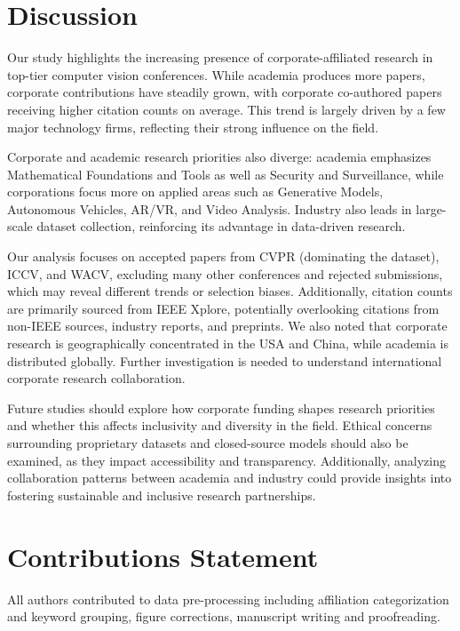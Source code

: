 \documentclass{article}
\begin{document}
\section{Discussion}
\vspace{-7pt}
Our study highlights the increasing presence of corporate-affiliated research in top-tier computer vision conferences. While academia produces more papers, corporate contributions have steadily grown, with corporate co-authored papers receiving higher citation counts on average. This trend is largely driven by a few major technology firms, reflecting their strong influence on the field.

Corporate and academic research priorities also diverge: academia emphasizes Mathematical Foundations and Tools as well as Security and Surveillance, while corporations focus more on applied areas such as Generative Models, Autonomous Vehicles, AR/VR, and Video Analysis. Industry also leads in large-scale dataset collection, reinforcing its advantage in data-driven research.

Our analysis focuses on accepted papers from CVPR (dominating the dataset), ICCV, and WACV, excluding many other conferences and rejected submissions, which may reveal different trends or selection biases. Additionally, citation counts are primarily sourced from IEEE Xplore, potentially overlooking citations from non-IEEE sources, industry reports, and preprints. We also noted that corporate research is geographically concentrated in the USA and China, while academia is distributed globally. Further investigation is needed to understand international corporate research collaboration.

Future studies should explore how corporate funding shapes research priorities and whether this affects inclusivity and diversity in the field. Ethical concerns surrounding proprietary datasets and closed-source models should also be examined, as they impact accessibility and transparency. Additionally, analyzing collaboration patterns between academia and industry could provide insights into fostering sustainable and inclusive research partnerships.
\vspace{-7pt}
\section{Contributions Statement}
\vspace{-7pt}
All authors contributed to data pre-processing including affiliation categorization and keyword grouping, figure corrections, manuscript writing and proofreading. 
\end{document}

